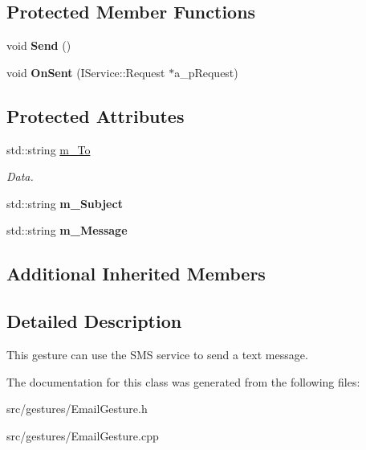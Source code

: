 \subsection*{Protected Member Functions}
\begin{DoxyCompactItemize}
\item 
\mbox{\label{class_email_gesture_a2022ae28deecc2b3cf5ebfd5bdb5b6e2}} 
void {\bfseries Send} ()
\item 
\mbox{\label{class_email_gesture_a7bae857915df2b0be2bccec653424584}} 
void {\bfseries On\+Sent} (I\+Service\+::\+Request $\ast$a\+\_\+p\+Request)
\end{DoxyCompactItemize}
\subsection*{Protected Attributes}
\begin{DoxyCompactItemize}
\item 
\mbox{\label{class_email_gesture_a997e18da9492231149945da5d060f96a}} 
std\+::string \hyperlink{class_email_gesture_a997e18da9492231149945da5d060f96a}{m\+\_\+\+To}
\begin{DoxyCompactList}\small\item\em Data. \end{DoxyCompactList}\item 
\mbox{\label{class_email_gesture_a6ed94a30670dc081a4beeab638bc2844}} 
std\+::string {\bfseries m\+\_\+\+Subject}
\item 
\mbox{\label{class_email_gesture_a054b73a0c0aa72fe3c1d057d80242132}} 
std\+::string {\bfseries m\+\_\+\+Message}
\end{DoxyCompactItemize}
\subsection*{Additional Inherited Members}


\subsection{Detailed Description}
This gesture can use the S\+MS service to send a text message. 

The documentation for this class was generated from the following files\+:\begin{DoxyCompactItemize}
\item 
src/gestures/Email\+Gesture.\+h\item 
src/gestures/Email\+Gesture.\+cpp\end{DoxyCompactItemize}
